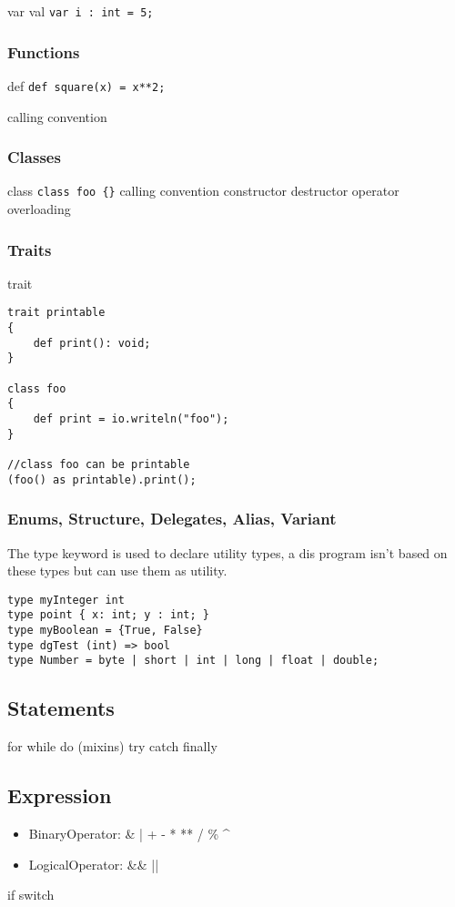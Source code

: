 \documentclass[a4paper]{article}
\begin{document}
var val
\lstinline!var i : int = 5;!

\subsubsection*{Functions}
def
\lstinline!def square(x) = x**2;!

calling convention

\subsubsection*{Classes}
class
\lstinline!class foo {}!
calling convention
constructor
destructor
operator overloading

\subsubsection*{Traits}
trait
\begin{lstlisting}
trait printable
{
	def print(): void;
}

class foo
{
	def print = io.writeln("foo");
}

//class foo can be printable
(foo() as printable).print();
\end{lstlisting}

\subsubsection*{Enums, Structure, Delegates, Alias, Variant}
The type keyword is used to declare utility types, a dis program isn't based on these types but can use them as utility.

\begin{lstlisting}
type myInteger int
type point { x: int; y : int; }
type myBoolean = {True, False}
type dgTest (int) => bool
type Number = byte | short | int | long | float | double;
\end{lstlisting}


\subsection{Statements}
for while do (mixins) try catch finally

\subsection{Expression}
\begin{itemize}
\item BinaryOperator: \& | + - * ** / \% \textasciicircum{} 
\item LogicalOperator: \&\&  ||
\end{itemize}
if 
switch
\end{document}
